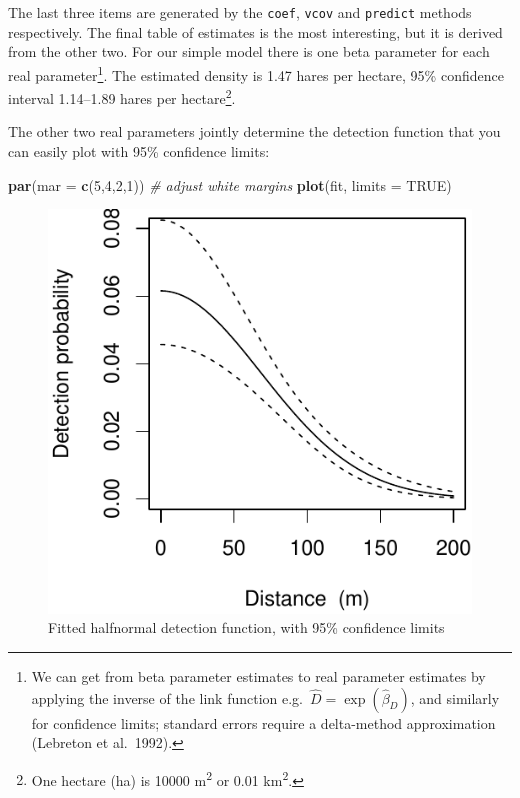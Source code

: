 \documentclass[
]{book}
\newenvironment{Shaded}{\begin{snugshade}}{\end{snugshade}}
\newcommand{\AttributeTok}[1]{\textcolor[rgb]{0.13,0.29,0.53}{#1}}
\newcommand{\CommentTok}[1]{\textcolor[rgb]{0.56,0.35,0.01}{\textit{#1}}}
\newcommand{\ConstantTok}[1]{\textcolor[rgb]{0.56,0.35,0.01}{#1}}
\newcommand{\DecValTok}[1]{\textcolor[rgb]{0.00,0.00,0.81}{#1}}
\newcommand{\FunctionTok}[1]{\textcolor[rgb]{0.13,0.29,0.53}{\textbf{#1}}}
\newcommand{\NormalTok}[1]{#1}
\begin{document}
The last three items are generated by the \texttt{coef}, \texttt{vcov} and \texttt{predict} methods respectively. The final table of estimates is the most interesting, but it is derived from the other two. For our simple model there is one beta parameter for each real parameter\footnote{We can get from beta parameter estimates to real parameter estimates by applying the inverse of the link function e.g.~\(\hat D = \exp(\hat \beta_D)\), and similarly for confidence limits; standard errors require a delta-method approximation (Lebreton et al.~1992).}. The estimated density is 1.47 hares per hectare, 95\% confidence interval 1.14--1.89 hares per hectare\footnote{One hectare (ha) is 10000 m\textsuperscript{2} or 0.01 km\textsuperscript{2}.}.

The other two real parameters jointly determine the detection function that you can easily plot with 95\% confidence limits:

\begin{Shaded}
\begin{Highlighting}[]
\FunctionTok{par}\NormalTok{(}\AttributeTok{mar =} \FunctionTok{c}\NormalTok{(}\DecValTok{5}\NormalTok{,}\DecValTok{4}\NormalTok{,}\DecValTok{2}\NormalTok{,}\DecValTok{1}\NormalTok{))  }\CommentTok{\# adjust white margins}
\FunctionTok{plot}\NormalTok{(fit, }\AttributeTok{limits =} \ConstantTok{TRUE}\NormalTok{)}
\end{Highlighting}
\end{Shaded}

\begin{figure}

{\centering \includegraphics{SECRbook_files/figure-latex/plotfit-1} 

}

\caption{Fitted halfnormal detection function, with 95\% confidence limits}\label{fig:plotfit}
\end{figure}
\end{document}
